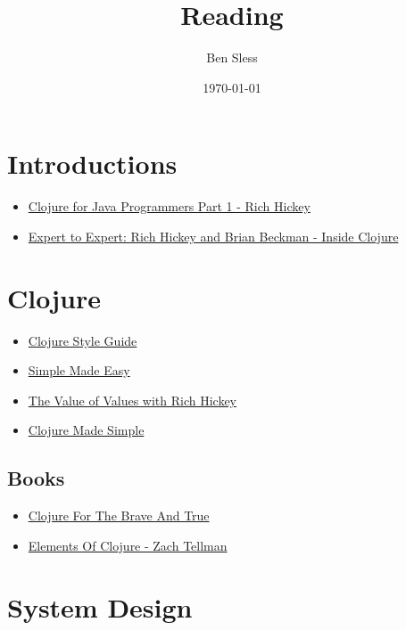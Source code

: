 \documentclass[11pt]{article}
\author{Ben Sless}
\date{\today}
\title{Reading}
\begin{document}
\maketitle
\tableofcontents


\section{Introductions}
\label{sec:org3a83f47}

\begin{itemize}
\item \href{https://www.youtube.com/watch?v=P76Vbsk\_3J0}{Clojure for Java Programmers Part 1 - Rich Hickey}
\item \href{https://www.youtube.com/watch?v=wASCH\_gPnDw}{Expert to Expert: Rich Hickey and Brian Beckman - Inside Clojure}
\end{itemize}

\section{Clojure}
\label{sec:orgb2dc844}

\begin{itemize}
\item \href{https://github.com/bbatsov/clojure-style-guide}{Clojure Style Guide}
\item \href{https://www.infoq.com/presentations/Simple-Made-Easy/}{Simple Made Easy}
\item \href{https://www.youtube.com/watch?v=-6BsiVyC1kM}{The Value of Values with Rich Hickey}
\item \href{https://www.youtube.com/watch?v=VSdnJDO-xdg}{Clojure Made Simple}
\end{itemize}

\subsection{Books}
\label{sec:org97ce661}

\begin{itemize}
\item \href{https://www.braveclojure.com/}{Clojure For The Brave And True}
\item \href{https://leanpub.com/elementsofclojure}{Elements Of Clojure - Zach Tellman}
\end{itemize}

\section{System Design}
\label{sec:orgdfd5b22}
\end{document}
